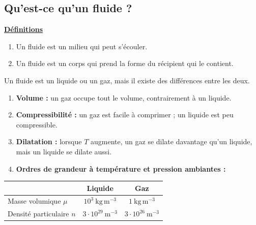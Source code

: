 \documentclass[11pt,a4paper]{article}
\newcommand{\titr}[1]{\par\needspace{4\baselineskip}\textbf{\underline{#1}}\par}
\begin{document}
\subsection{Qu'est-ce qu'un fluide ?}
\titr{Définitions}
\begin{enumerate}
\item Un fluide est un milieu qui peut s'écouler.
\item Un fluide est un corps qui prend la forme du récipient qui le contient.
\end{enumerate}
Un fluide est un liquide ou un gaz, mais il existe des différences entre les deux.
\begin{enumerate}
\item \textbf{Volume :} un gaz occupe tout le volume, contrairement à un liquide.
\item \textbf{Compressibilité :} un gaz est facile à comprimer ; un liquide est peu compressible.
\item \textbf{Dilatation :} lorsque $T$ augmente, un gaz se dilate davantage qu'un liquide, mais un liquide se dilate aussi.
\item \textbf{Ordres de grandeur à température et pression ambiantes :}
\end{enumerate}
\begin{center}\renewcommand{\arraystretch}{1.5}
\begin{tabular}{l|c|c}
& Liquide & Gaz\\\hline
Masse volumique $\mu$ & $10^3\ \mathrm{kg\,m^{-3}}$ & $1\ \mathrm{kg\,m^{-3}}$\\
Densité particulaire $n$ & $3\cdot10^{29}\ \mathrm{m^{-3}}$ & $3\cdot10^{26}\ \mathrm{m^{-3}}$
\end{tabular}\end{center}
\end{document}
